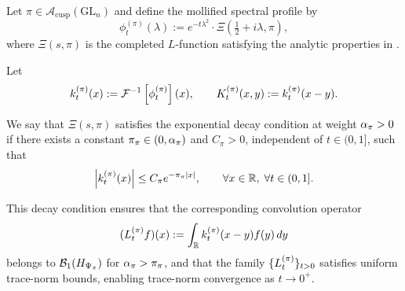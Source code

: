 \begin{definition}
\label{def:kernel_decay_condition}
Let \( \pi \in \mathcal{A}_{\mathrm{cusp}}(\mathrm{GL}_n) \) and define the mollified spectral profile by
\[
\phi_t^{(\pi)}(\lambda) := e^{-t\lambda^2} \cdot \Xi\left(\tfrac{1}{2} + i\lambda, \pi\right),
\]
where \( \Xi(s, \pi) \) is the completed \( L \)-function satisfying the analytic properties in .

Let
\[
k_t^{(\pi)}(x) := \mathcal{F}^{-1}\left[\phi_t^{(\pi)}\right](x), \qquad
K_t^{(\pi)}(x, y) := k_t^{(\pi)}(x - y).
\]

We say that \( \Xi(s, \pi) \) satisfies the exponential decay condition at weight \( \alpha_{\pi} > 0 \) if there exists a constant \( \pi_\pi \in (0, \alpha_{\pi}) \) and \( C_\pi > 0 \), independent of \( t \in (0, 1] \), such that
\[
\left|k_t^{(\pi)}(x)\right| \leq C_\pi e^{-\pi_\pi |x|}, \qquad \forall x \in \mathbb{R}, \; \forall t \in (0, 1].
\]

This decay condition ensures that the corresponding convolution operator
\[
(L_t^{(\pi)} f)(x) := \int_{\mathbb{R}} k_t^{(\pi)}(x - y) f(y) \, dy
\]
belongs to \( \mathcal{B}_1(H_{\Psi_{\pi}}) \) for \( \alpha_{\pi} > \pi_\pi \), and that the family \( \{ L_t^{(\pi)} \}_{t > 0} \) satisfies uniform trace-norm bounds, enabling trace-norm convergence as \( t \to 0^+ \).
\end{definition}
